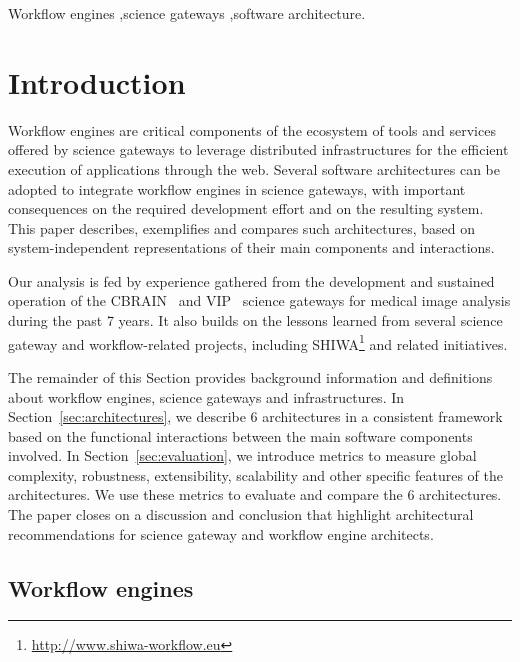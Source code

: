 \documentclass[preprint,3p,twocolumn]{elsarticle}
\begin{document}
\begin{frontmatter}
\begin{keyword}
Workflow engines \sep science gateways \sep software architecture.
\end{keyword}

\end{frontmatter}




\section{Introduction}

Workflow engines are critical components of the ecosystem of tools and
services offered by science gateways to leverage distributed
infrastructures for the efficient execution of applications through
the web. Several software architectures can be adopted to integrate
workflow engines in science gateways, with important consequences on
the required development effort and on the resulting system. This
paper describes, exemplifies and compares such architectures, based on
system-independent representations of their main components and
interactions.

Our analysis is fed by experience gathered from the development and
sustained operation of the CBRAIN~\cite{SHER-14} and
VIP~\cite{GLAT-13} science gateways for medical image analysis during
the past 7 years. It also builds on the lessons learned from several
science gateway and workflow-related projects, including
SHIWA\footnote{\url{http://www.shiwa-workflow.eu}} and related
initiatives.

The remainder of this Section provides background information and
definitions about workflow engines, science gateways and
infrastructures. In Section~\ref{sec:architectures}, we describe 6
architectures in a consistent framework based on the functional
interactions between the main software components involved. In
Section~\ref{sec:evaluation}, we introduce metrics to measure
global complexity, robustness, extensibility, scalability and other
specific features of the architectures. We use these metrics to
evaluate and compare the 6 architectures. The paper closes on a
discussion and conclusion that highlight architectural recommendations
for science gateway and workflow engine architects.

\subsection{Workflow engines}
\end{document}
